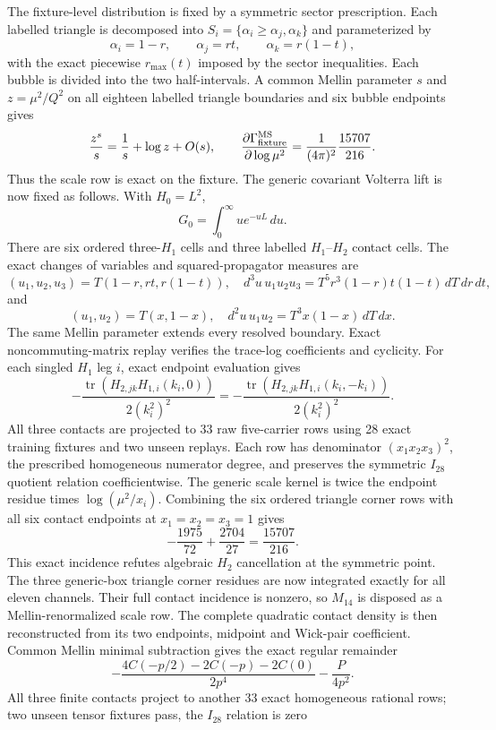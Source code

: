 \documentclass[11pt]{article}
\theoremstyle{definition}
\theoremstyle{remark}
\begin{document}
The fixture-level distribution is fixed by a symmetric sector prescription.
Each labelled triangle is decomposed into
$S_i=\{\alpha_i\geq\alpha_j,\alpha_k\}$ and parameterized by
\[
 \alpha_i=1-r,\qquad \alpha_j=rt,\qquad \alpha_k=r(1-t),
\]
with the exact piecewise $r_{\max}(t)$ imposed by the sector inequalities.
Each bubble is divided into the two half-intervals.  A common Mellin parameter
$s$ and $z=\mu^2/Q^2$ on all eighteen labelled triangle boundaries and six
bubble endpoints gives
\[
 \frac{z^s}{s}=\frac1s+\log z+O(s),\qquad
 \frac{\partial\Gamma_{\rm fixture}^{\rm MS}}{\partial\log\mu^2}
 =\frac1{(4\pi)^2}\frac{15707}{216}.
\]
Thus the scale row is exact on the fixture.  The generic covariant Volterra
lift is now fixed as follows.  With $H_0=L^2$,
\[
 G_0=\int_0^\infty u e^{-uL}\,du.
\]
There are six ordered three-$H_1$ cells and three labelled $H_1$--$H_2$
contact cells.  The exact changes of variables and squared-propagator measures
are
\[
 (u_1,u_2,u_3)=T(1-r,rt,r(1-t)),\quad
 d^3u\,u_1u_2u_3=T^5r^3(1-r)t(1-t)\,dT\,dr\,dt,
\]
and
\[
 (u_1,u_2)=T(x,1-x),\quad
 d^2u\,u_1u_2=T^3x(1-x)\,dT\,dx.
\]
The same Mellin parameter extends every resolved boundary.  Exact
noncommuting-matrix replay verifies the trace-log coefficients and cyclicity.
For each singled $H_1$ leg $i$, exact endpoint evaluation gives
\[
 -\frac{\operatorname{tr}(H_{2,jk}H_{1,i}(k_i,0))}{2(k_i^2)^2}
 =-\frac{\operatorname{tr}(H_{2,jk}H_{1,i}(k_i,-k_i))}{2(k_i^2)^2}.
\]
All three contacts are projected to 33 raw five-carrier rows using 28 exact
training fixtures and two unseen replays.  Each row has denominator
$(x_1x_2x_3)^2$, the prescribed homogeneous numerator degree, and preserves
the symmetric $I_{28}$ quotient relation coefficientwise.  The generic scale
kernel is twice the endpoint residue times $\log(\mu^2/x_i)$.  Combining the
six ordered triangle corner rows with all six contact endpoints at
$x_1=x_2=x_3=1$ gives
\[
 -\frac{1975}{72}+\frac{2704}{27}=\frac{15707}{216}.
\]
This exact incidence refutes algebraic $H_2$ cancellation at the symmetric
point.  The three generic-box triangle corner residues are now integrated
exactly for all eleven channels.  Their full contact incidence is nonzero,
so $M_{14}$ is disposed as a Mellin-renormalized scale row.  The complete
quadratic contact density is then reconstructed from its two endpoints,
midpoint and Wick-pair coefficient.  Common Mellin minimal subtraction gives
the exact regular remainder
\[
 -\frac{4C(-p/2)-2C(-p)-2C(0)}{2p^4}-\frac{P}{4p^2}.
\]
All three finite contacts project to another 33 exact homogeneous rational
rows; two unseen tensor fixtures pass, the $I_{28}$ relation is zero
\end{document}
